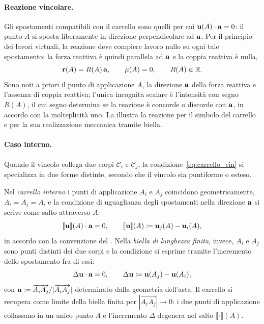 \paragraph{Reazione vincolare.}
Gli spostamenti compatibili con il carrello sono quelli per cui
$\mathbf{u}(A)\cdot\mathbf{a} = 0$: il punto $A$ si sposta liberamente in
direzione perpendicolare ad $\mathbf{a}$. Per il principio dei lavori
virtuali, la reazione deve compiere lavoro nullo su ogni tale
spostamento: la forza reattiva è quindi parallela ad $\mathbf{a}$ e la
coppia reattiva è nulla,
\begin{equation}\label{eq:reazione_carrello}
	\mathbf{r}(A) = R(A)\,\mathbf{a},
	\qquad
	\mu(A) = 0,
	\qquad
	R(A) \in \mathbb{R}.
\end{equation}
Sono noti a priori il punto di applicazione $A$, la direzione
$\mathbf{a}$ della forza reattiva e l'assenza di coppia reattiva;
l'unica incognita scalare è l'intensità con segno $R(A)$, il
cui segno determina se la reazione è concorde o discorde con
$\mathbf{a}$, in accordo con la molteplicità uno. La
 illustra la reazione per il simbolo
del carrello e per la sua realizzazione meccanica tramite
biella.









\paragraph{Caso interno.}
Quando il vincolo collega due corpi $\mathcal{C}_i$ e
$\mathcal{C}_j$, la condizione~\eqref{eq:carrello_cin} si
specializza in due forme distinte, secondo che il vincolo
sia puntiforme o esteso.


Nel \emph{carrello interno} i punti di applicazione $A_i$
e $A_j$ coincidono geometricamente, $A_i = A_j = A$, e la
condizione di uguaglianza degli spostamenti nella direzione
$\mathbf{a}$ si scrive come salto attraverso $A$:
\begin{equation}\label{eq:carrello_int_punt}
	\llbracket \mathbf{u} \rrbracket(A) \cdot \mathbf{a} = 0,
	\qquad
	\llbracket \mathbf{u} \rrbracket(A) \coloneqq \mathbf{u}_j(A) -
	\mathbf{u}_i(A),
\end{equation}
in accordo con la convenzione del
. Nella \emph{biella di
	lunghezza finita}, invece, $A_i$ e $A_j$ sono punti
distinti dei due corpi e la condizione si esprime tramite
l'incremento dello spostamento fra di essi:
\begin{equation}\label{eq:carrello_int_est}
	\Delta\mathbf{u} \cdot \mathbf{a} = 0,
	\qquad
	\Delta\mathbf{u} \coloneqq \mathbf{u}(A_j) - \mathbf{u}(A_i),
\end{equation}
con $\mathbf{a} \coloneqq \overrightarrow{A_i A_j}/
|\overrightarrow{A_i A_j}|$ determinato dalla geometria
dell'asta. Il carrello si recupera come limite della
biella finita per $|\overrightarrow{A_i A_j}| \to 0$: i
due punti di applicazione collassano in un unico punto
$A$ e l'incremento $\Delta$ degenera nel salto
$\llbracket \cdot \rrbracket(A)$.


